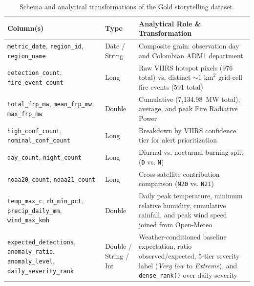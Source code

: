 \documentclass[11pt,letterpaper]{article}
\begin{document}
\begin{table}[H]
  \centering
  \footnotesize
  \setlength{\tabcolsep}{4pt}
  \begin{tabularx}{\textwidth}{>{\raggedright\arraybackslash}p{3.6cm} >{\raggedright\arraybackslash}p{2.0cm} >{\raggedright\arraybackslash}X}
    \toprule
    \textbf{Column(s)} & \textbf{Type} & \textbf{Analytical Role \& Transformation} \\
    \midrule
    \texttt{metric\_date}, \texttt{region\_id}, \texttt{region\_name} & Date / String & Composite grain: observation day and Colombian ADM1 department \\
    \addlinespace
    \texttt{detection\_count}, \texttt{fire\_event\_count} & Long & Raw VIIRS hotspot pixels (976 total) vs. distinct $\sim 1\text{ km}^2$ grid-cell fire events (591 total) \\
    \addlinespace
    \texttt{total\_frp\_mw}, \texttt{mean\_frp\_mw}, \texttt{max\_frp\_mw} & Double & Cumulative (7,134.98~MW total), average, and peak Fire Radiative Power \\
    \addlinespace
    \texttt{high\_conf\_count}, \texttt{nominal\_conf\_count} & Long & Breakdown by VIIRS confidence tier for alert prioritization \\
    \addlinespace
    \texttt{day\_count}, \texttt{night\_count} & Long & Diurnal vs. nocturnal burning split (\texttt{D} vs. \texttt{N}) \\
    \addlinespace
    \texttt{noaa20\_count}, \texttt{noaa21\_count} & Long & Cross-satellite contribution comparison (\texttt{N20} vs. \texttt{N21}) \\
    \addlinespace
    \texttt{temp\_max\_c}, \texttt{rh\_min\_pct}, \texttt{precip\_daily\_mm}, \texttt{wind\_max\_kmh} & Double & Daily peak temperature, minimum relative humidity, cumulative rainfall, and peak wind speed joined from Open-Meteo \\
    \addlinespace
    \texttt{expected\_detections}, \texttt{anomaly\_ratio}, \texttt{anomaly\_level}, \texttt{daily\_severity\_rank} & Double / String / Int & Weather-conditioned baseline expectation, ratio $\text{observed}/\text{expected}$, 5-tier severity label (\textit{Very low} to \textit{Extreme}), and \texttt{dense\_rank()} over daily severity \\
    \bottomrule
  \end{tabularx}
  \caption{Schema and analytical transformations of the Gold storytelling dataset.}
  \label{tab:storytelling_schema}
\end{table}
\end{document}
